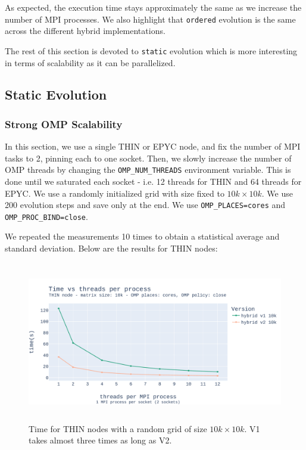 \documentclass{report}
\begin{document}
As expected, the execution time stays approximately the same as we increase the 
number of MPI processes. 
We also highlight that \texttt{ordered} evolution is the same across the different 
hybrid implementations. 

The rest of this section is devoted to \texttt{static} evolution which is 
more interesting in terms of scalability as it can be parallelized.

\subsection{Static Evolution}

\subsubsection{Strong OMP Scalability}

In this section, we use a single THIN or EPYC node, and fix the number of MPI 
tasks to 2, pinning each to one socket. Then, we slowly increase the 
number of OMP threads by changing the \texttt{OMP\_NUM\_THREADS} environment 
variable. This is done until we saturated each socket - i.e. 12 threads for THIN 
and 64 threads for EPYC. We use a randomly initialized grid with size fixed to 
$10k \times 10k$. We use 200 evolution steps and save only at the end. 
We use \texttt{OMP\_PLACES=cores} and \texttt{OMP\_PROC\_BIND=close}.

We repeated the measurements 10 times to obtain a statistical average and standard 
deviation. Below are the results for THIN nodes:

\begin{figure}[H]
\centering
\includegraphics[width=14cm, height=7cm]{./images/strong_OMP_thin_hybrid_grid_010k.pdf}
\caption{\label{fig:strongomp10kspeedupthin} Time for THIN nodes with a 
random grid of size $10k \times 10k$. V1 takes almost three times as long as V2.}
\end{figure}
\end{document}
